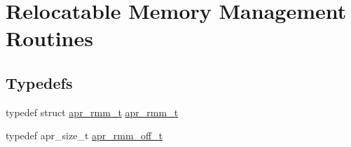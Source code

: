 \hypertarget{group___a_p_r___util___r_m_m}{\section{Relocatable Memory Management Routines}
\label{group___a_p_r___util___r_m_m}
}
\subsection*{Typedefs}
\begin{DoxyCompactItemize}
\item 
typedef struct \hyperlink{group___a_p_r___util___r_m_m_gadb4d418c417ece33c4430ba9df59070a}{apr\-\_\-rmm\-\_\-t} \hyperlink{group___a_p_r___util___r_m_m_gadb4d418c417ece33c4430ba9df59070a}{apr\-\_\-rmm\-\_\-t}
\item 
typedef apr\-\_\-size\-\_\-t \hyperlink{group___a_p_r___util___r_m_m_ga70b508c81a0bc75350efdefb3410af12}{apr\-\_\-rmm\-\_\-off\-\_\-t}
\end{DoxyCompactItemize}
